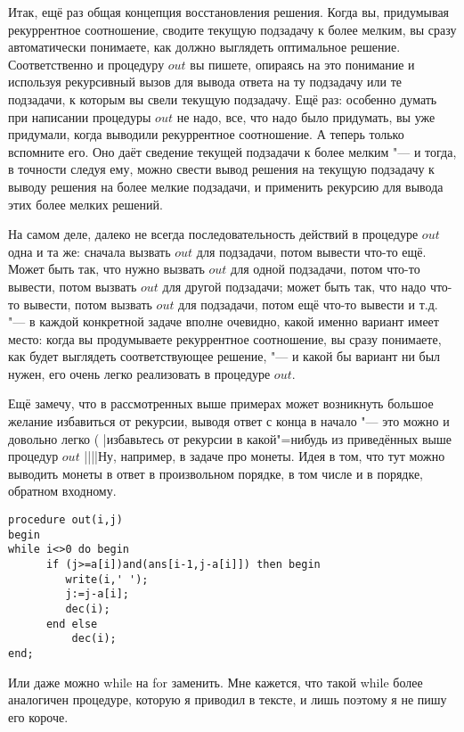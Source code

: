 Итак, ещё раз общая концепция восстановления решения. Когда вы, придумывая рекуррентное соотношение,
сводите текущую подзадачу к более мелким, вы сразу автоматически понимаете, как должно выглядеть
оптимальное решение. Соответственно и процедуру $out$ вы пишете, опираясь на это понимание и
используя рекурсивный вызов для вывода ответа на ту подзадачу или те подзадачи, к которым вы свели
текущую подзадачу. Ещё раз: особенно думать при написании процедуры $out$ не надо, все, что надо 
было придумать, вы уже придумали, когда выводили рекуррентное соотношение. А теперь только 
вспомните его. Оно даёт сведение текущей подзадачи к более мелким "--- и тогда, в точности следуя 
ему, можно свести вывод решения на текущую подзадачу к выводу решения на более мелкие подзадачи, и 
применить рекурсию для вывода этих более мелких решений.

На самом деле, далеко не всегда последовательность действий в процедуре $out$ одна и та же: сначала
вызвать $out$ для подзадачи, потом вывести что-то ещё. Может быть так, что нужно вызвать $out$ для
одной подзадачи, потом что-то вывести, потом вызвать $out$ для другой подзадачи; может быть так, что
надо что-то вывести, потом вызвать $out$ для подзадачи, потом ещё что-то вывести и т.д. "--- в
каждой конкретной задаче вполне очевидно, какой именно вариант имеет место: когда вы продумываете
рекуррентное соотношение, вы сразу понимаете, как будет выглядеть соответствующее решение, "--- и
какой бы вариант ни был нужен, его очень легко реализовать в процедуре $out$.

Ещё замечу, что в рассмотренных выше примерах может возникнуть большое желание избавиться от
рекурсии, выводя ответ с конца в начало "--- это можно и довольно легко (%
\task|избавьтесь от рекурсии в какой"=нибудь из приведённых выше процедур $out$%
||||Ну, например, в задаче про монеты. Идея в том, что тут можно выводить монеты в ответ в произвольном 
порядке, в том числе и в порядке, обратном входному.
\begin{codesampleo}\begin{verbatim}
procedure out(i,j)
begin
while i<>0 do begin
      if (j>=a[i])and(ans[i-1,j-a[i]]) then begin
         write(i,' ');
         j:=j-a[i];
         dec(i);
      end else 
          dec(i);
end;
\end{verbatim}
\end{codesampleo}
Или даже можно while на for заменить. Мне кажется, что такой while более аналогичен процедуре, 
которую я приводил в тексте, и лишь поэтому я не пишу его короче.

